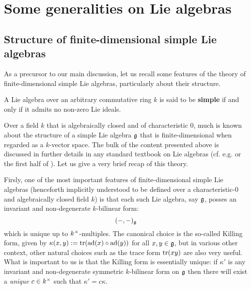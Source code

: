 \section{Some generalities on Lie algebras}
    \subsection{Structure of finite-dimensional simple Lie algebras}
        As a precursor to our main discussion, let us recall some features of the theory of finite-dimensional simple Lie algebras, particularly about their structure.

        \begin{definition}
            A Lie algebra over an arbitrary commutative ring $k$ is said to be \textbf{simple} if and only if it admits no non-zero Lie ideals. 
        \end{definition}

        Over a field $k$ that is algebraically closed and of characteristic $0$, much is known about the structure of a simple Lie algebra $\mathfrak{g}$ that is finite-dimensional when regarded as a $k$-vector space. The bulk of the content presented above is discussed in further details in any standard textbook on Lie algebras (cf. e.g. \cite{humphreys_lie_algebras} or the first half of \cite{carter_affine_lie_algebras}). Let us give a very brief recap of this theory.

        Firsly, one of the most important features of finite-dimensional simple Lie algebras (henceforth implicitly understood to be defined over a characteristic-$0$ and algebraically closed field $k$) is that each such Lie algebra, say $\mathfrak{g}$, posses an invariant and non-degenerate $k$-bilinear form:
            $$(-, -)_{\mathfrak{g}}$$
        which is unique up to $k^{\x}$-multiples. The canonical choice is the so-called Killing form, given by $\kappa(x, y) := \operatorname{tr}(\mathrm{ad}(x) \circ \mathrm{ad}(y))$ for all $x, y \in \mathfrak{g}$, but in various other context, other natural choices such as the trace form $\operatorname{tr}(xy)$ are also very useful. What is important to us is that the Killing form is essentially unique: if $\kappa'$ is any invariant and non-degenerate symmetric $k$-bilinear form on $\mathfrak{g}$ then there will exist a \textit{unique} $c \in k^{\x}$ such that $\kappa' = c \kappa$.

